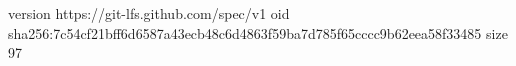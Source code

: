 version https://git-lfs.github.com/spec/v1
oid sha256:7c54cf21bff6d6587a43ecb48c6d4863f59ba7d785f65cccc9b62eea58f33485
size 97
